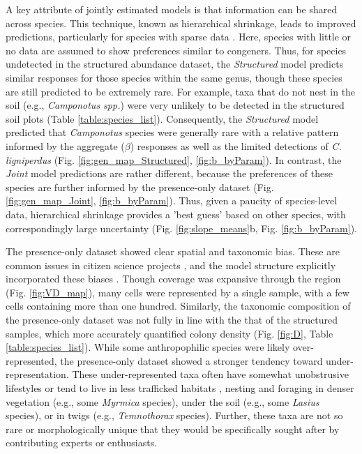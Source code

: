 \documentclass[preprint,final,times,12pt,3p]{elsarticle}
\begin{document}
A key attribute of jointly estimated models is that information can be shared across species. This technique, known as hierarchical shrinkage, leads to improved predictions, particularly for species with sparse data \citep{Fithian2015}. Here, species with little or no data are assumed to show preferences similar to congeners. Thus, for species undetected in the structured abundance dataset, the \emph{Structured} model predicts similar responses for those species within the same genus, though these species are still predicted to be extremely rare. For example, taxa that do not nest in the soil (e.g., \emph{Camponotus spp.}) were very unlikely to be detected in the structured soil plots (Table \ref{table:species_list}). Consequently, the \emph{Structured} model  predicted that \emph{Camponotus} species were generally rare with a relative pattern informed by the aggregate ($\beta$) responses as well as the limited detections of \emph{C. ligniperdus} (Fig. \ref{fig:gen_map_Structured}, \ref{fig:b_byParam}). In contrast, the \emph{Joint} model predictions are rather different, because the preferences of these species are further informed by the presence-only dataset (Fig. \ref{fig:gen_map_Joint}, \ref{fig:b_byParam}). Thus, given a paucity of species-level data, hierarchical shrinkage provides a 'best guess' based on other species, with correspondingly large uncertainty (Fig. \ref{fig:slope_means}b, Fig. \ref{fig:b_byParam}).

The presence-only dataset showed clear spatial and taxonomic bias. These are common issues in citizen science projects \citep{Ward2014,Theobald2015,Johnston2020,Robinson2020}, and the model structure explicitly incorporated these biases \citep{Isaac2014}. Though coverage was expansive through the region (Fig. \ref{fig:VD_map}), many cells were represented by a single sample, with a few cells containing more than one hundred. Similarly, the taxonomic composition of the presence-only dataset was not fully in line with the that of the structured samples, which more accurately quantified colony density (Fig. \ref{fig:D}, Table \ref{table:species_list}). While some anthropophilic species were likely over-represented, the presence-only dataset showed a stronger tendency toward under-representation. These under-represented taxa often have somewhat unobstrusive lifestyles or tend to live in less trafficked habitats \citep{Seifert2018}, nesting and foraging in denser vegetation (e.g., some \emph{Myrmica} species), under the soil (e.g., some \emph{Lasius} species), or in twigs (e.g., \emph{Temnothorax} species). Further, these taxa are not so rare or morphologically unique that they would be specifically sought after by contributing experts or enthusiasts. 
\end{document}
